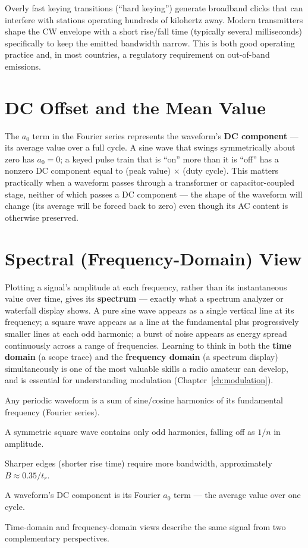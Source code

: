 \begin{safetynote}
Overly fast keying transitions (``hard keying'') generate broadband
clicks that can interfere with stations operating hundreds of kilohertz
away. Modern transmitters shape the CW envelope with a short rise/fall
time (typically several milliseconds) specifically to keep the emitted
bandwidth narrow. This is both good operating practice and, in most
countries, a regulatory requirement on out-of-band emissions.
\label{sec:harmonic-interference}
\end{safetynote}

\section{DC Offset and the Mean Value}

The $a_0$ term in the Fourier series represents the waveform's
\textbf{DC component} --- its average value over a full cycle. A sine
wave that swings symmetrically about zero has $a_0 = 0$; a keyed pulse
train that is ``on'' more than it is ``off'' has a nonzero DC component
equal to (peak value) $\times$ (duty cycle). This matters practically
when a waveform passes through a transformer or capacitor-coupled stage,
neither of which passes a DC component --- the shape of the waveform will
change (its average will be forced back to zero) even though its AC
content is otherwise preserved.

\section{Spectral (Frequency-Domain) View}

Plotting a signal's amplitude at each frequency, rather than its
instantaneous value over time, gives its \textbf{spectrum} --- exactly
what a spectrum analyzer or waterfall display shows. A pure sine wave
appears as a single vertical line at its frequency; a square wave appears
as a line at the fundamental plus progressively smaller lines at each odd
harmonic; a burst of noise appears as energy spread continuously across a
range of frequencies. Learning to think in both the \textbf{time domain}
(a scope trace) and the \textbf{frequency domain} (a spectrum display)
simultaneously is one of the most valuable skills a radio amateur can
develop, and is essential for understanding modulation
(Chapter~\ref{ch:modulation}).

\begin{quickreview}
\item Any periodic waveform is a sum of sine/cosine harmonics of its
fundamental frequency (Fourier series).
\item A symmetric square wave contains only odd harmonics, falling off as
$1/n$ in amplitude.
\item Sharper edges (shorter rise time) require more bandwidth,
approximately $B \approx 0.35/t_r$.
\item A waveform's DC component is its Fourier $a_0$ term --- the
average value over one cycle.
\item Time-domain and frequency-domain views describe the same signal
from two complementary perspectives.
\end{quickreview}

